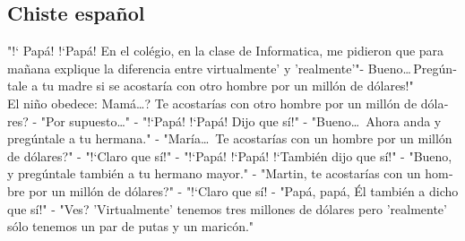 \documentclass{scrartcl}
\begin{document}
\subsection{Chiste espa\~nol}
\begin{spanish}
"!` Papá! !`Papá! En el colégio, en la clase de Informatica, me pidieron que para ma\~nana explique la diferencia entre virtualmente' y 'realmente'"- Bueno\dots \,Pregúntale a tu madre si se acostaría con otro hombre por un millón de dólares!"\\ 
El ni\~no obedece: \textquestiondown Mamá\dots ? \textquestiondown Te acostarías con otro hombre por un millón de dólares? - "Por supuesto\dots " - "!`Papá! !`Papá! Dijo que sí!" - "Bueno\dots \, Ahora anda y pregúntale a tu hermana." - "María\dots \, \textquestiondown Te acostarías con un hombre por un millón de  dólares?" - "!`Claro que sí!" - "!`Papá! !`Papá! !`También dijo que sí!" - "Bueno, y pregúntale también a tu hermano mayor." - "\textquestiondown Martin, te acostarías con un hombre por un millón de dólares?" - "!`Claro que sí! - "Papá, papá, Él también a dicho que sí!" - "\textquestiondown Ves? 'Virtualmente' tenemos tres millones de dólares pero 'realmente' sólo tenemos un par de putas y un maricón."	
\end{spanish}
\end{document}
